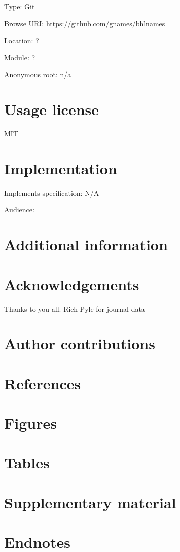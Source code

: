 \documentclass[
]{article}
\begin{document}
Type: Git

Browse URI: https://github.com/gnames/bhlnames

Location: ?

Module: ?

Anonymous root: n/a

\hypertarget{usage-license}{%
\section{Usage license}\label{usage-license}}

MIT

\hypertarget{implementation}{%
\section{Implementation}\label{implementation}}

Implements specification: N/A

Audience:

\hypertarget{additional-information}{%
\section{Additional information}\label{additional-information}}

\hypertarget{acknowledgements}{%
\section{Acknowledgements}\label{acknowledgements}}

Thanks to you all. Rich Pyle for journal data

\hypertarget{author-contributions}{%
\section{Author contributions}\label{author-contributions}}

\hypertarget{references}{%
\section{References}\label{references}}

\hypertarget{figures}{%
\section{Figures}\label{figures}}

\hypertarget{tables}{%
\section{Tables}\label{tables}}

\hypertarget{supplementary-material}{%
\section{Supplementary material}\label{supplementary-material}}

\hypertarget{endnotes}{%
\section{Endnotes}\label{endnotes}}
\end{document}
